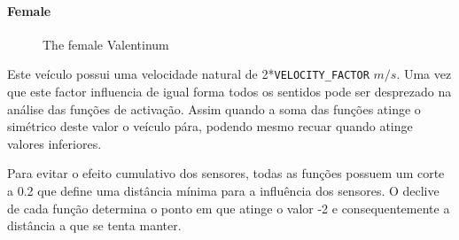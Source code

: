 \documentclass[a4paper]{article}
\begin{document}
\paragraph{Female}
\begin{figure}[ht]
	\centering
	\caption{The female Valentinum}
\end{figure}

\indent Este veículo possui uma velocidade natural de 2*\texttt{VELOCITY\_FACTOR} $m/s$.
Uma vez que este factor influencia de igual forma todos os sentidos pode ser desprezado na análise das funções de activação. 
Assim quando a soma das funções atinge o simétrico deste valor o veículo pára, podendo mesmo recuar quando atinge valores inferiores.

\indent Para evitar o efeito cumulativo dos sensores, todas as funções possuem um corte a 0.2 que define uma distância mínima para a influência dos sensores.
O declive de cada função determina o ponto em que atinge o valor -2 e consequentemente a distância a que se tenta manter. 

\cleardoublepage
\end{document}
